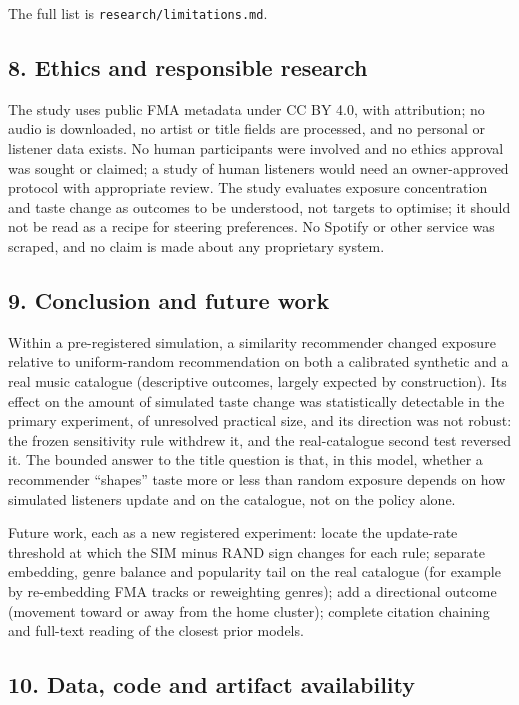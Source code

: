 \documentclass[
]{article}
\begin{document}
The full list is \texttt{research/limitations.md}.

\subsection{8. Ethics and responsible
research}\label{ethics-and-responsible-research}

The study uses public FMA metadata under CC BY 4.0, with attribution; no
audio is downloaded, no artist or title fields are processed, and no
personal or listener data exists. No human participants were involved
and no ethics approval was sought or claimed; a study of human listeners
would need an owner-approved protocol with appropriate review. The study
evaluates exposure concentration and taste change as outcomes to be
understood, not targets to optimise; it should not be read as a recipe
for steering preferences. No Spotify or other service was scraped, and
no claim is made about any proprietary system.

\subsection{9. Conclusion and future
work}\label{conclusion-and-future-work}

Within a pre-registered simulation, a similarity recommender changed
exposure relative to uniform-random recommendation on both a calibrated
synthetic and a real music catalogue (descriptive outcomes, largely
expected by construction). Its effect on the amount of simulated taste
change was statistically detectable in the primary experiment, of
unresolved practical size, and its direction was not robust: the frozen
sensitivity rule withdrew it, and the real-catalogue second test
reversed it. The bounded answer to the title question is that, in this
model, whether a recommender ``shapes'' taste more or less than random
exposure depends on how simulated listeners update and on the catalogue,
not on the policy alone.

Future work, each as a new registered experiment: locate the update-rate
threshold at which the SIM minus RAND sign changes for each rule;
separate embedding, genre balance and popularity tail on the real
catalogue (for example by re-embedding FMA tracks or reweighting
genres); add a directional outcome (movement toward or away from the
home cluster); complete citation chaining and full-text reading of the
closest prior models.

\subsection{10. Data, code and artifact
availability}\label{data-code-and-artifact-availability}
\end{document}
